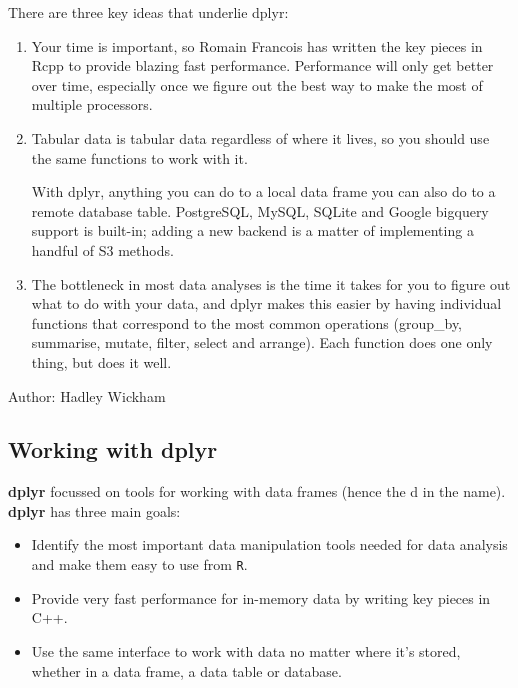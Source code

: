 	\begin{framed}
		
		
		\noindent There are three key ideas that underlie dplyr:
		
		\begin{enumerate}
			\item Your time is important, so Romain Francois has written the key pieces in Rcpp to provide blazing fast performance. Performance will only get better over time, especially once we figure out the best way to make the most of multiple processors. 
			
			\item Tabular data is tabular data regardless of where it lives, so you should use the same functions to work with it. 
			
			With dplyr, anything you can do to a local data frame you can also do to a remote database table. PostgreSQL, MySQL, SQLite and Google bigquery support is built-in; adding a new backend is a matter of implementing a handful of S3 methods. 
			
			\item The bottleneck in most data analyses is the time it takes for you to figure out what to do with your data, and dplyr makes this easier by having individual functions that correspond to the most common operations  (group\_by, summarise, mutate, filter, select and arrange). Each function does one only thing, but does it well.
		\end{enumerate}
		Author: Hadley Wickham
	\end{framed}
	
	
	\subsection{Working with dplyr} \textbf{dplyr} focussed on tools for working with data frames (hence the d in the name). \textbf{dplyr} has three main goals:
	
	
	\begin{itemize}
		\item Identify the most important data manipulation tools needed for data analysis and make them easy to use from \texttt{R}.
		
		\item Provide very fast performance for in-memory data by writing key pieces in C++.
		
		\item Use the same interface to work with data no matter where it's stored, whether in a data frame, a data table or database.
	\end{itemize}
